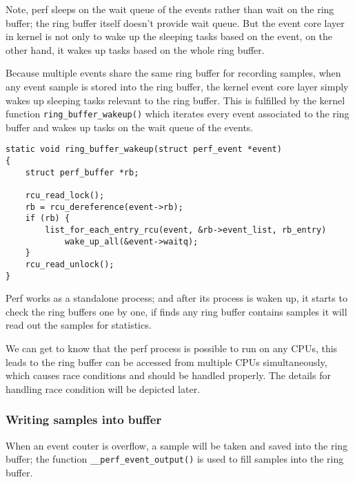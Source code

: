 \documentclass[11pt]{diazessay} %
\def\code#1{\texttt{#1}}
\begin{document}
Note, perf sleeps on the wait queue of the events rather than wait on the ring buffer; the ring buffer itself doesn't provide wait queue.  But the event core layer in kernel is not only to wake up the sleeping tasks based on the event, on the other hand, it wakes up tasks based on the whole ring buffer.

Because multiple events share the same ring buffer for recording samples, when any event sample is stored into the ring buffer, the kernel event core layer simply wakes up sleeping tasks relevant to the ring buffer.  This is fulfilled by the kernel function \code{ring\_buffer\_wakeup()} which iterates every event associated to the ring buffer and wakes up tasks on the wait queue of the events.

\begin{lstlisting}
static void ring_buffer_wakeup(struct perf_event *event)
{
	struct perf_buffer *rb;

	rcu_read_lock();
	rb = rcu_dereference(event->rb);
	if (rb) {
		list_for_each_entry_rcu(event, &rb->event_list, rb_entry)
			wake_up_all(&event->waitq);
	}
	rcu_read_unlock();
}
\end{lstlisting}

Perf works as a standalone process; and after its process is waken up, it starts to check the ring buffers one by one, if finds any ring buffer contains samples it will read out the samples for statistics.

We can get to know that the perf process is possible to run on any CPUs, this leads to the ring buffer can be accessed from multiple CPUs simultaneously, which causes race conditions and should be handled properly.  The details for handling race condition will be depicted later.

\subsubsection*{Writing samples into buffer}

When an event couter is overflow, a sample will be taken and saved into the ring buffer; the function \code{\_\_perf\_event\_output()} is used to fill samples into the ring buffer.
\end{document}
